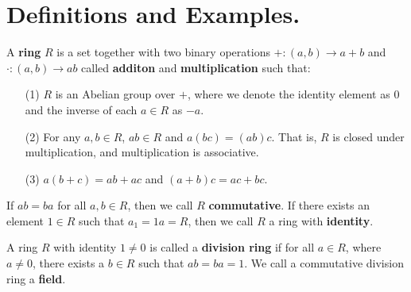 
\section{Definitions and Examples.}
\label{section1}

\begin{definition}
    A \textbf{ring} $R$ is a set together with two binary operations  $+:(a,b)
    \xrightarrow{} a+b$ and $\cdot:(a,b) \xrightarrow{} ab$ called
    \textbf{additon} and \textbf{multiplication} such that:
    \begin{enumerate}
        \item[(1)] $R$ is an Abelian group over $+$, where we denote the
            identity element as $0$ and the inverse of each $a \in R$ as $-a$.

        \item[(2)] For any $a,b \in R$,  $ab \in R$ and $a(bc)=(ab)c$. That is,
            $R$ is closed under multiplication, and  multiplication is
            associative.

        \item[(3)] $a(b+c)=ab+ac$ and $(a+b)c=ac+bc$.
    \end{enumerate}
    If $ab=ba$ for all  $a,b \in R$, then we call $R$ \textbf{commutative}. If
    there exists an element $1 \in R$ such that  $a_1=1a=R$, then we call $R$ a
    ring with  \textbf{identity}.
\end{definition}

\begin{definition}
    A ring $R$ with identity $1 \neq 0$ is called a \textbf{division ring} if
    for all $a \in R$, where  $a \neq 0$, there exists a  $b \in R$ such that
    $ab=ba=1$. We call a commutative division ring a \textbf{field}.
\end{definition}

